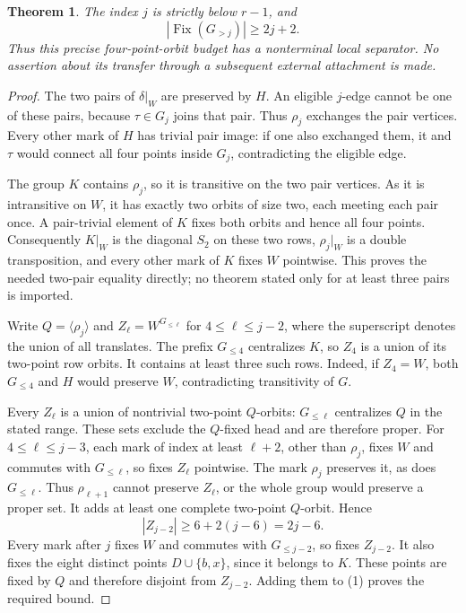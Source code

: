 \documentclass[11pt,a4paper]{article}
\newtheorem{theorem}{Theorem}
\newcommand{\gen}[1]{\langle#1\rangle}
\begin{document}
\begin{theorem}
The index $j$ is strictly below $r-1$, and
\[
                       |\operatorname{Fix}(G_{>j})|\ge2j+2.
\]
Thus this precise four-point-orbit budget has a nonterminal
local separator. No assertion about its transfer through a
subsequent external attachment is made.
\end{theorem}
\begin{proof}
The two pairs of $\delta|_W$ are preserved by $H$.
An eligible $j$-edge cannot be one of these pairs,
because $\tau\in G_j$ joins that pair. Thus $\rho_j$
exchanges the pair vertices. Every other mark of $H$
has trivial pair image: if one also exchanged them,
it and $\tau$ would connect all four points inside
$G_j$, contradicting the eligible edge.

The group $K$ contains $\rho_j$, so it is transitive
on the two pair vertices. As it is intransitive on $W$,
it has exactly two orbits of size two, each meeting
each pair once. A pair-trivial element of $K$ fixes
both orbits and hence all four points. Consequently
$K|_W$ is the diagonal $S_2$ on these two rows,
$\rho_j|_W$ is a double transposition, and every
other mark of $K$ fixes $W$ pointwise. This proves
the needed two-pair equality directly; no theorem
stated only for at least three pairs is imported.

Write $Q=\gen{\rho_j}$ and $Z_\ell=W^{G_{\le\ell}}$
for $4\le\ell\le j-2$, where the superscript denotes
the union of all translates. The prefix $G_{\le4}$
centralizes $K$, so $Z_4$ is a union of its two-point
row orbits. It contains at least three such rows.
Indeed, if $Z_4=W$, both $G_{\le4}$ and $H$ would
preserve $W$, contradicting transitivity of $G$.

Every $Z_\ell$ is a union of nontrivial two-point
$Q$-orbits: $G_{\le\ell}$ centralizes $Q$ in the
stated range. These sets exclude the $Q$-fixed head
and are therefore proper. For $4\le\ell\le j-3$,
each mark of index at least $\ell+2$, other than
$\rho_j$, fixes $W$ and commutes with $G_{\le\ell}$,
so fixes $Z_\ell$ pointwise. The mark $\rho_j$
preserves it, as does $G_{\le\ell}$. Thus
$\rho_{\ell+1}$ cannot preserve $Z_\ell$, or the
whole group would preserve a proper set. It adds at
least one complete two-point $Q$-orbit. Hence
\[
                       |Z_{j-2}|\ge6+2(j-6)=2j-6.       \tag{1}
\]
Every mark after $j$ fixes $W$ and commutes with
$G_{\le j-2}$, so fixes $Z_{j-2}$. It also fixes
the eight distinct points $D\cup\{b,x\}$, since
it belongs to $K$. These points are fixed by $Q$
and therefore disjoint from $Z_{j-2}$. Adding them
to (1) proves the required bound.


\end{proof}
\end{document}
